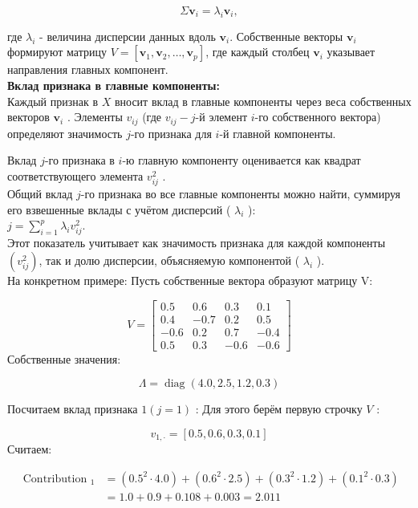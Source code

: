 $$
    \Sigma \mathbf{v}_i=\lambda_i \mathbf{v}_i,
$$


где $\lambda_i$ - величина дисперсии данных вдоль $\mathbf{v}_i$.
Собственные векторы $\mathbf{v}_i$ формируют матрицу $V=\left[\mathbf{v}_1, \mathbf{v}_2, \ldots, \mathbf{v}_p\right]$, где каждый столбец $\mathbf{v}_i$ указывает направления главных компонент.\\
\textbf{Вклад признака в главные компоненты:}\\

Каждый признак в $X$ вносит вклад в главные компоненты через веса собственных векторов $\mathbf{v}_i$ . Элементы $v_{i j}$ (где $v_{i j}-j$-й элемент $i$-го собственного вектора) определяют значимость $j$-го признака для $i$-й главной компоненты.

Вклад $j$-го признака в $i$-ю главную компоненту оценивается как квадрат соответствующего элемента $v_{i j}^2$ .\\

Общий вклад $j$-го признака во все главные компоненты можно найти, суммируя его взвешенные вклады с учётом дисперсий ( $\lambda_i$ ):\\
$j=\sum_{i=1}^p \lambda_i v_{i j}^2$.\\
Этот показатель учитывает как значимость признака для каждой компоненты $\left(v_{i j}^2\right)$, так и долю дисперсии, объясняемую компонентой ( $\lambda_i$ ).\\
На конкретном примере:
Пусть собственные вектора образуют матрицу V:

$$
    V=\left[\begin{array}{cccc}
            0.5  & 0.6  & 0.3  & 0.1  \\
            0.4  & -0.7 & 0.2  & 0.5  \\
            -0.6 & 0.2  & 0.7  & -0.4 \\
            0.5  & 0.3  & -0.6 & -0.6
        \end{array}\right]
$$
Собственные значения:

$$
    \Lambda=\operatorname{diag}(4.0,2.5,1.2,0.3)
$$

Посчитаем вклад признака $1(j=1)$ :
Для этого берём первую строчку $V$ :

$$
    v_{1, \cdot}=[0.5,0.6,0.3,0.1]
$$
Считаем:

$$
    \begin{aligned}
        \text { Contribution }_1 & =\left(0.5^2 \cdot 4.0\right)+\left(0.6^2 \cdot 2.5\right)+\left(0.3^2 \cdot 1.2\right)+\left(0.1^2 \cdot 0.3\right) \\
                                 & =1.0+0.9+0.108+0.003=2.011
    \end{aligned}
$$

